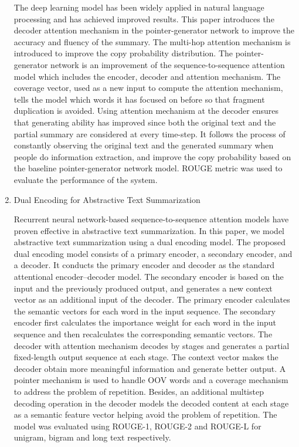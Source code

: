 \documentclass[11pt]{report}
\begin{document}
\begin{enumerate}
	The deep learning model has been widely applied in natural language processing and has achieved improved results. This paper introduces the decoder attention mechanism in the pointer-generator network to improve the accuracy and fluency of the summary. The multi-hop attention mechanism is introduced to improve the copy probability distribution. The pointer-generator network is an improvement of the sequence-to-sequence attention model which includes the encoder, decoder and attention mechanism. The coverage vector, used as a new input to compute the attention mechanism, tells the model which words it has focused on before so that fragment duplication is avoided. Using attention mechanism at the decoder ensures that generating ability has improved since both the original text and the partial summary are considered at every time-step. It follows the process of constantly observing the original text and the generated summary when people do information extraction, and improve the copy probability based on the baseline pointer-generator network model. ROUGE metric was used to evaluate the performance of the system.\\
\pagebreak
    \item Dual Encoding for Abstractive Text Summarization\cite{7}
    
	Recurrent neural network-based sequence-to-sequence attention models have proven effective in abstractive text summarization. In this paper, we model abstractive text summarization using a dual encoding model. The proposed dual encoding model consists of a primary encoder, a secondary encoder, and a decoder. It conducts the primary encoder and decoder as the standard attentional encoder–decoder model. The secondary encoder is based on the input and the previously produced output, and generates a new context vector as an additional input of the decoder. The primary encoder calculates the semantic vectors for each word in the input sequence. The secondary encoder first calculates the importance weight for each word in the input sequence and then recalculates the corresponding semantic vectors. The decoder with attention mechanism decodes by stages and generates a partial fixed-length output sequence at each stage. The context vector makes the decoder obtain more meaningful information and generate better output. A pointer mechanism is used to handle OOV words and a coverage mechanism to address the problem of repetition. Besides, an additional multistep decoding operation in the decoder models the decoded content at each stage as a semantic feature vector helping avoid the problem of repetition.  The model was evaluated using ROUGE-1, ROUGE-2 and ROUGE-L for unigram, bigram and long text respectively.\\


\end{enumerate}
\end{document}
